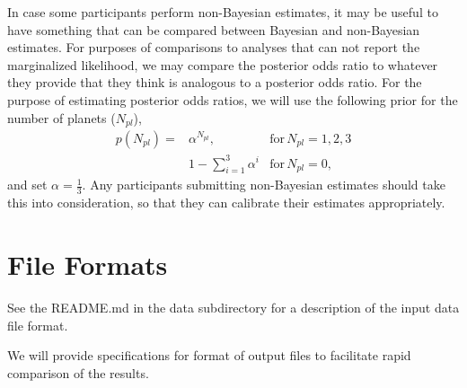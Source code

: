 \documentclass{article}
\begin{document}
In case some participants perform non-Bayesian estimates, it may be useful to have something that can be compared between Bayesian and non-Bayesian estimates.  For purposes of comparisons to analyses that can not report the marginalized likelihood, we may compare the posterior odds ratio to whatever they provide that they think is analogous to a posterior odds ratio.  
For the purpose of estimating posterior odds ratios, we will use the following prior for the number of planets ($N_{pl}$),
\begin{eqnarray}
p(N_{pl}) = & \alpha^{N_{pl}}, \,\, & \mathrm{for} \, N_{pl}={1,2,3} \\
            & 1-\sum_{i=1}^3 \alpha^i & \mathrm{for} \, N_{pl}=0,
\end{eqnarray}
and set $\alpha=\frac{1}{3}$.  
Any participants submitting non-Bayesian estimates should take this into consideration, so that they can calibrate their estimates appropriately. 

\section{File Formats}
See the README.md in the data subdirectory for a description of the input data file format.

We will provide specifications for format of output files to facilitate rapid comparison of the results. 
\end{document}
